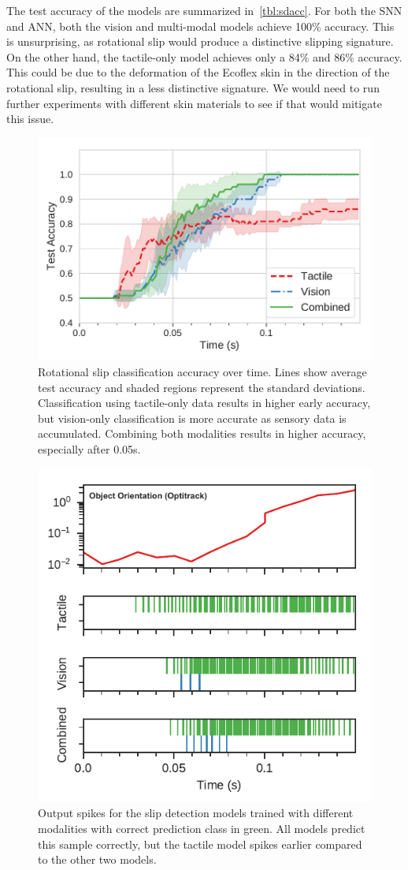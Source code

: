 \documentclass[fyp]{socreport}
\begin{document}
The test accuracy of the models are summarized in~\autoref{tbl:sdacc}. For both
the SNN and ANN, both the vision and multi-modal models achieve 100\% accuracy.
This is unsurprising, as rotational slip would produce a distinctive slipping
signature. On the other hand, the tactile-only model achieves only a 84\% and
86\% accuracy. This could be due to the deformation of the Ecoflex skin in the
direction of the rotational slip, resulting in a less distinctive signature. We
would need to run further experiments with different skin materials to see if
that would mitigate this issue.

\begin{figure}
\centering
\includegraphics[width=0.55\columnwidth]{images/analysis/slip_over_time.pdf}
\caption{Rotational slip classification accuracy over time. Lines show average
  test accuracy and shaded regions represent the standard deviations.
  Classification using tactile-only data results in higher early accuracy, but
  vision-only classification is more accurate as sensory data is accumulated.
  Combining both modalities results in higher accuracy, especially after
  0.05s.\label{fig:sliptime}}
\end{figure}

\begin{figure}
\centering
\includegraphics[width=0.55\columnwidth]{images/analysis/slip_class_output.pdf}
\caption{Output spikes for the slip detection models trained with different
  modalities with correct prediction class in green. All models predict this
  sample correctly, but the tactile model spikes earlier compared to the other
  two models.\label{fig:spikeslip}}
\end{figure}
\end{document}
